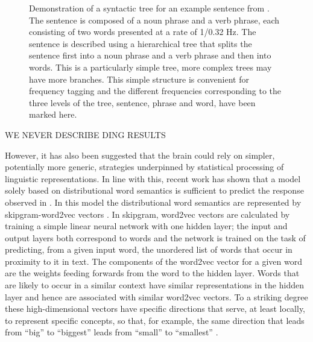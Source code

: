 \documentclass[10pt,letterpaper]{article}
\begin{document}
\begin{figure}[tb]
\begin{center}
\end{center}
\caption{Demonstration of a syntactic tree for an example sentence
  from \cite{DingEtAl2016, DingEtAl2017}. The sentence is composed of
  a noun phrase and a verb phrase, each consisting of two words
  presented at a rate of 1/0.32 Hz.  The sentence is described using a
  hierarchical tree that splits the sentence first into a noun phrase
  and a verb phrase and then into words. This is a particularly simple
  tree, more complex trees may have more branches. This simple
  structure is convenient for frequency tagging and the different
  frequencies corresponding to the three levels of the tree, sentence,
  phrase and word, have been marked here.}
\label{fig:freq_tree}
\end{figure}

WE NEVER DESCRIBE DING RESULTS

However, it has also been suggested that the brain could rely on
simpler, potentially more generic, strategies underpinned by
statistical processing of linguistic representations. In line with
this, recent work \cite{FrankYang2018} has shown that a model solely
based on distributional word semantics is sufficient to predict the
response observed in \cite{DingEtAl2016, DingEtAl2017}. In this model
the distributional word semantics are represented by skipgram-word2vec
vectors \cite{MikolovEtAl2013,Bojanowski2017}. In skipgram, word2vec
vectors are calculated by training a simple linear neural network with
one hidden layer; the input and output layers both correspond to words
and the network is trained on the task of predicting, from a given
input word, the unordered list of words that occur in proximity to it
in text. The components of the word2vec vector for a given word are
the weights feeding forwards from the word to the hidden layer. Words
that are likely to occur in a similar context have similar
representations in the hidden layer and hence are associated with
similar word2vec vectors. To a striking degree these high-dimensional
vectors have specific directions that serve, at least locally, to
represent specific concepts, so that, for example, the same direction
that leads from ``big'' to ``biggest'' leads from ``small'' to
``smallest'' \cite{MikolovEtAl2013b, MikolovEtAl2013c}.
\end{document}
